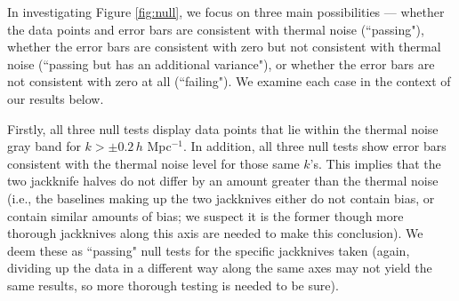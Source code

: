 \documentclass[preprint2,numberedappendix,tighten]{aastex6}  %
\begin{document}

In investigating Figure \ref{fig:null}, we focus on three main possibilities --- whether the data points and error bars are consistent with thermal noise (``passing"), whether the error bars are consistent with zero but not consistent with thermal noise (``passing but has an additional variance"), or whether the error bars are not consistent with zero at all (``failing"). We examine each case in the context of our results below.

Firstly, all three null tests display data points that lie within the thermal noise gray band for $k > \pm 0.2$\,$h$ Mpc$^{-1}$. In addition, all three null tests show error bars consistent with the thermal noise level for those same $k$'s. This implies that the two jackknife halves do not differ by an amount greater than the thermal noise (i.e., the baselines making up the two jackknives either do not contain bias, or contain similar amounts of bias; we suspect it is the former though more thorough jackknives along this axis are needed to make this conclusion). We deem these as ``passing" null tests for the specific jackknives taken (again, dividing up the data in a different way along the same axes may not yield the same results, so more thorough testing is needed to be sure).
\end{document}
